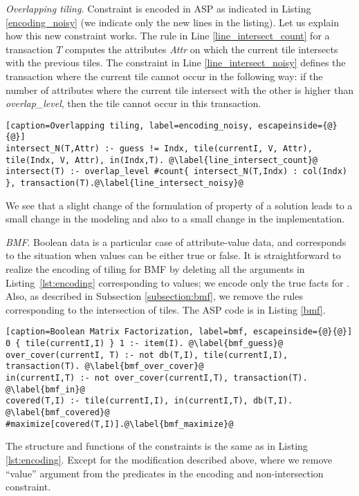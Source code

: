 \lstset{
  basicstyle=\footnotesize,
}

\textit{Overlapping tiling.} Constraint \overlappingTilesConstraint is encoded in ASP as indicated in Listing \ref{encoding_noisy} (we indicate only the new lines in the listing). Let us explain how this new constraint works. The rule in Line \ref{line_intersect_count} for a transaction $T$ computes the attributes \textit{Attr} on which the current tile intersects with the previous tiles. The constraint in Line \ref{line_intersect_noisy} defines the transaction where the current tile cannot occur in the following way: if the number of attributes where the current tile intersect with the other is higher than \textit{overlap\_level}, then the tile cannot occur in this transaction.

\begin{lstlisting}[caption=Overlapping tiling, label=encoding_noisy, escapeinside={@}{@}] 
intersect_N(T,Attr) :- guess != Indx, tile(currentI, V, Attr), tile(Indx, V, Attr), in(Indx,T). @\label{line_intersect_count}@
intersect(T) :- overlap_level #count{ intersect_N(T,Indx) : col(Indx) }, transaction(T).@\label{line_intersect_noisy}@
\end{lstlisting}

We see that a slight change of the formulation of property of a solution leads to a small change in the modeling and also to a small change in the implementation.

\textit{BMF}. Boolean data is a particular case of attribute-value data, and corresponds to the situation when values can be either true or false.  It is straightforward to realize the encoding of tiling for BMF by deleting all the arguments in Listing~\ref{lst:encoding} corresponding to values; we encode only the true facts for \dbbin. Also, as described in Subsection \ref{subsection:bmf}, we remove the rules corresponding to the intersection of tiles. The ASP code is in Listing \ref{bmf}. 
\begin{lstlisting}[caption=Boolean Matrix Factorization, label=bmf, escapeinside={@}{@}] 
0 { tile(currentI,I) } 1 :- item(I). @\label{bmf_guess}@
over_cover(currentI, T) :- not db(T,I), tile(currentI,I), transaction(T). @\label{bmf_over_cover}@
in(currentI,T) :- not over_cover(currentI,T), transaction(T). @\label{bmf_in}@
covered(T,I) :- tile(currentI,I), in(currentI,T), db(T,I). @\label{bmf_covered}@
#maximize[covered(T,I)].@\label{bmf_maximize}@
\end{lstlisting}

The structure and functions of the constraints is the same as in Listing \ref{lst:encoding}. Except for the modification described above, where we remove ``value'' argument from the predicates in the encoding and non-intersection constraint.

